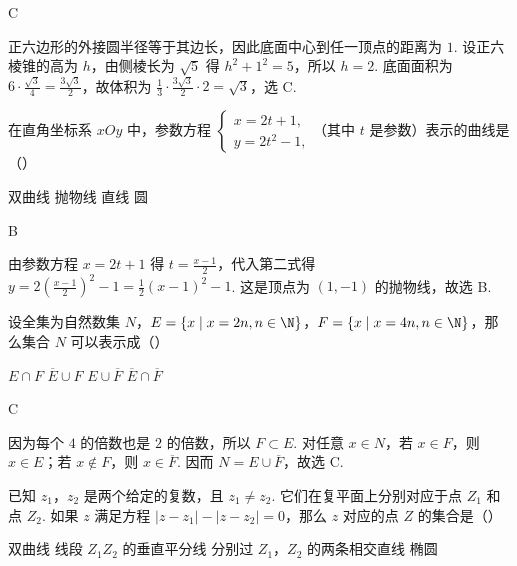\documentclass[UTF8,a4paper,oneside,11pt]{ctexbook}
\begin{document}
\begin{answer}
C
\end{answer}

\begin{solution}
正六边形的外接圆半径等于其边长，因此底面中心到任一顶点的距离为 \(1\). 设正六棱锥的高为 \(h\)，由侧棱长为 \(\sqrt{5}\) 得 \(h^2+1^2=5\)，所以 \(h=2\). 底面面积为 \(6\cdot\frac{\sqrt{3}}{4}=\frac{3\sqrt{3}}{2}\)，故体积为 \(\frac{1}{3}\cdot\frac{3\sqrt{3}}{2}\cdot 2=\sqrt{3}\)，选 C.
\end{solution}

\begin{problem}
在直角坐标系 \(xOy\) 中，参数方程 \(\begin{cases}
x=2t+1,\\
y=2t^2-1,
\end{cases}\)（其中 \(t\) 是参数）表示的曲线是（\quad）

\choices
    {双曲线}
    {抛物线}
    {直线}
    {圆}

\end{problem}

\begin{answer}
B
\end{answer}

\begin{solution}
由参数方程 \(x=2t+1\) 得 \(t=\frac{x-1}{2}\)，代入第二式得 \(y=2\left(\frac{x-1}{2}\right)^2-1=\frac{1}{2}(x-1)^2-1\). 这是顶点为 \((1,-1)\) 的抛物线，故选 B.
\end{solution}

\begin{problem}
设全集为自然数集 \(N\)，\(E=\{x\mid x=2n, n\in \N\}\)，\(F=\{x\mid x=4n, n\in \N\}\)，那么集合 \(N\) 可以表示成（\quad）

\choices
    {\(E\cap F\)}
    {\(\overline{E}\cup F\)}
    {\(E\cup \overline{F}\)}
    {\(\overline{E}\cap \overline{F}\)}

\end{problem}

\begin{answer}
C
\end{answer}

\begin{solution}
因为每个 \(4\) 的倍数也是 \(2\) 的倍数，所以 \(F\subset E\). 对任意 \(x\in N\)，若 \(x\in F\)，则 \(x\in E\)；若 \(x\notin F\)，则 \(x\in\overline{F}\). 因而 \(N=E\cup\overline{F}\)，故选 C.
\end{solution}

\begin{problem}
已知 \(z_1\)，\(z_2\) 是两个给定的复数，且 \(z_1\neq z_2\). 它们在复平面上分别对应于点 \(Z_1\) 和点 \(Z_2\). 如果 \(z\) 满足方程 \(\left| z-z_1 \right|-\left| z-z_2 \right|=0\)，那么 \(z\) 对应的点 \(Z\) 的集合是（\quad）

\choices
    {双曲线}
    {线段 \(Z_1Z_2\) 的垂直平分线}
    {分别过 \(Z_1\)，\(Z_2\) 的两条相交直线}
    {椭圆}

\end{problem}
\end{document}
